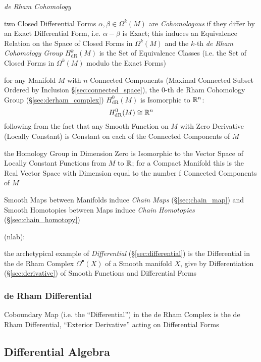 \emph{de Rham Cohomology}

two Closed Differential Forms $\alpha, \beta \in \Omega^k(M)$ are
\emph{Cohomologous} if they differ by an Exact Differential Form, i.e. $\alpha -
\beta$ is Exact; this induces an Equivalence Relation on the Space of Closed
Forms in $\Omega^k(M)$ and
the $k$-th \emph{de Rham Cohomology Group} $H_{\mathrm{dR}}^k(M)$ is the Set of
Equivalence Classes (i.e. the Set of Closed Forms in $\Omega^k(M)$ modulo the
Exact Forms)

for any Manifold $M$ with $n$ Connected Components (Maximal Connected Subset
Ordered by Inclusion \S\ref{sec:connected_space}), the $0$-th de Rham Cohomology
Group (\S\ref{sec:derham_complex}) $H_{\mathrm{dR}}^0(M)$ is Isomorphic to
$\mathbb{R}^n$:
\[
  H_{\mathrm{dR}}^0(M) \cong \mathbb{R}^n
\]
following from the fact that any Smooth Function on $M$ with Zero Derivative
(Locally Constant) is Constant on each of the Connected Components of $M$

the Homology Group in Dimension Zero is Isomorphic to the Vector Space of
Locally Constant Functions from $M$ to $\mathbb{R}$; for a Compact Manifold this is
the Real Vector Space with Dimension equal to the number f Connected Components
of $M$

Smooth Maps between Manifolds induce \emph{Chain Maps} (\S\ref{sec:chain_map})
and Smooth Homotopies between Maps induce \emph{Chain Homotopies}
(\S\ref{sec:chain_homotopy})


(nlab):

the archetypical example of \emph{Differential} (\S\ref{sec:differential}) is
the Differential in the de Rham Complex $\Omega^\bullet(X)$ of a Smooth manifold
$X$, give by Differentiation (\S\ref{sec:derivative}) of Smooth Functions and
Differential Forms



\subsubsection{de Rham Differential}\label{sec:derham_differential}

Coboundary Map (i.e. the ``Differential'') in the de Rham Complex is the de Rham
Differential, ``Exterior Derivative'' acting on Differential Forms



\subsection{Differential Algebra}\label{sec:differential_algebra}

